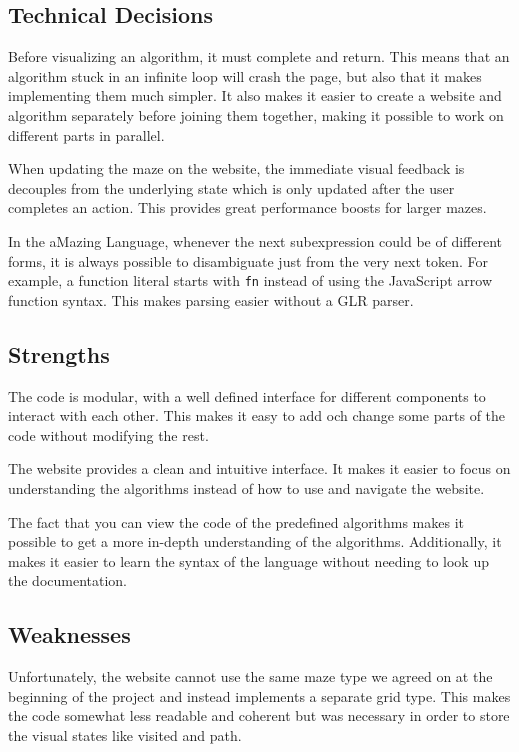 \subsection{Technical Decisions}

Before visualizing an algorithm, it must complete and return. This means that an algorithm stuck in an infinite loop will crash the page, but also that it makes implementing them much simpler. It also makes it easier to create a website and algorithm separately before joining them together, making it possible to work on different parts in parallel.

When updating the maze on the website, the immediate visual feedback is decouples from the underlying state which is only updated after the user completes an action. This provides great performance boosts for larger mazes.

In the aMazing Language, whenever the next subexpression could be of different forms, it is always possible to disambiguate just from the very next token. For example, a function literal starts with \verb|fn| instead of using the JavaScript arrow function syntax. This makes parsing easier without a GLR parser.

\subsection{Strengths}

The code is modular, with a well defined interface for different components to interact with each other. This makes it easy to add och change some parts of the code without modifying the rest.

The website provides a clean and intuitive interface. It makes it easier to focus on understanding the algorithms instead of how to use and navigate the website.

The fact that you can view the code of the predefined algorithms makes it possible to get a more in-depth understanding of the algorithms. Additionally, it makes it easier to learn the syntax of the language without needing to look up the documentation.

\subsection{Weaknesses}

Unfortunately, the website cannot use the same maze type we agreed on at the beginning of the project and instead implements a separate grid type. This makes the code somewhat less readable and coherent but was necessary in order to store the visual states like visited and path.

